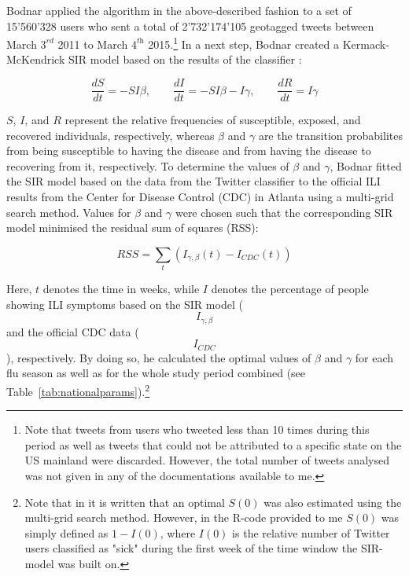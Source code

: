 \documentclass[11pt, a4paper]{report}\usepackage[]{graphicx}\usepackage[]{color}
\begin{document}
Bodnar applied the algorithm in the above-described fashion to a set of 15'560'328 users who sent a total of 2'732'174'105 geotagged tweets between March $3^\textit{rd}$ 2011 to March $4^\textit{th}$ 2015.\footnote{Note that tweets from users who tweeted less than 10 times during this period as well as tweets that could not be attributed to a specific state on the US mainland were discarded. However, the total number of tweets analysed was not given in any of the documentations available to me.} In a next step, Bodnar created a Kermack-McKendrick SIR model based on the results of the classifier \citep{martcheva2015introduction}:

$$\frac{dS}{dt} = -SI\beta, \qquad \frac{dI}{dt} = -SI\beta - I\gamma, \qquad \frac{dR}{dt} = I\gamma$$

$S$, $I$, and $R$ represent the relative frequencies of susceptible, exposed, and recovered individuals, respectively, whereas $\beta$ and $\gamma$ are the transition probabilites from being susceptible to having the disease and from having the disease to recovering from it, respectively. To determine the values of $\beta$ and $\gamma$, Bodnar fitted the SIR model based on the data from the Twitter classifier to the official ILI results from the Center for Disease Control (CDC) in Atlanta using a multi-grid search method. Values for $\beta$ and $\gamma$ were chosen such that the corresponding SIR model minimised the residual sum of squares (RSS):

$$RSS = \sum_{t}(I_{\gamma,\beta}(t)-I_{CDC}(t))$$

Here, $t$ denotes the time in weeks, while $I$ denotes the percentage of people showing ILI symptoms based on the SIR model ($$I_{\gamma,\beta}$$ and the official CDC data ($$I_{CDC}$$), respectively. By doing so, he calculated the optimal values of $\beta$ and $\gamma$ for each flu season as well as for the whole study period combined (see Table~\ref{tab:nationalparams}).\footnote{Note that in \citep{bodnar_data_2015} it is written that an optimal $S(0)$ was also estimated using the multi-grid search method. However, in the R-code provided to me $S(0)$ was simply defined as $1-I(0)$, where $I(0)$ is the relative number of Twitter users classified as "sick" during the first week of the time window the SIR-model was built on.}
\end{document}
